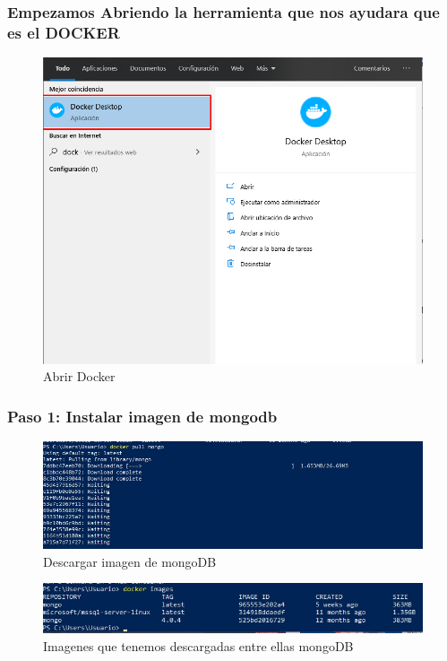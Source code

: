 \documentclass[preprint,12pt]{elsarticle}
\begin{document}
\subsubsection{\textbf{Empezamos Abriendo la herramienta que nos ayudara que es el DOCKER}}
\begin{figure}[H]
	\begin{center}
		\includegraphics[width=12cm]{./IMAGENES/img1} 
		\caption{Abrir Docker}
	\end{center}
\end{figure}


\subsubsection{\textbf{Paso 1: Instalar imagen de mongodb}}
\begin{figure}[H]
	\begin{center}
		\includegraphics[width=12cm]{./IMAGENES/foto1} 
		\caption{Descargar imagen de mongoDB}
	\end{center}
\end{figure}

\begin{figure}[H]
	\begin{center}
		\includegraphics[width=12cm]{./IMAGENES/foto2} 
		\caption{Imagenes que tenemos descargadas entre ellas mongoDB}
	\end{center}
\end{figure}
\end{document}
